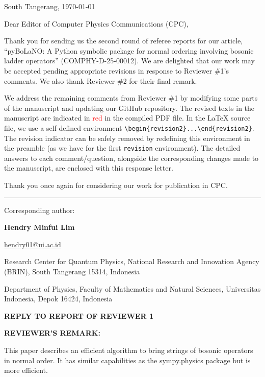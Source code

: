\documentclass[12pt, a4paper]{article}
\newcommand{\review}[1]{
\newpage
\phantomsection
\begin{center}
\Large{\uppercase{{\textbf{Reply to Report of Reviewer {#1}}}}}
\end{center}
}
\newenvironment{revremark}{%
\phantomsection
\vspace{12pt}
\color{RoyalPurple}
\par
\textbf{REVIEWER'S REMARK:}
\par
}
{}
\begin{document}
\sloppy


\begin{flushright}
    South Tangerang, \today
\end{flushright}

\bigskip

Dear Editor of Computer Physics Communications (CPC), 

Thank you for sending us the second round of referee reports for our article, ``pyBoLaNO: A Python symbolic package for normal ordering involving bosonic ladder operators'' (COMPHY-D-25-00012). We are delighted that our work may be accepted pending appropriate revisions in response to Reviewer \#1’s comments. We also thank Reviewer \#2 for their final remark.

We address the remaining comments from Reviewer \#1 by modifying some parts of the manuscript and updating our GitHub repository. The revised texts in the manuscript are indicated in \textcolor{red}{red} in the compiled PDF file. In the LaTeX source file, we use a self-defined environment \verb|\begin{revision2}...\end{revision2}|. The revision indicator can be safely removed by redefining this environment in the preamble (as we have for the first \texttt{revision} environment). The detailed answers to each comment/question, alongside the corresponding changes made to the manuscript, are enclosed with this response letter.

Thank you once again for considering our work for publication in CPC.

\bigskip
\hrule
\bigskip

Corresponding author:

\textbf{Hendry Minfui Lim}\

\url{hendry01@ui.ac.id}

{Research Center for Quantum Physics, National Research and Innovation Agency (BRIN), South Tangerang 15314, Indonesia}

{Department of Physics, Faculty of Mathematics and Natural Sciences, Universitas Indonesia, Depok 16424, Indonesia}


\review{1}


\begin{revremark}
This paper describes an efficient algorithm to bring strings of bosonic operators in normal order. It has similar capabilities as the sympy.physics package but is more efficient.
\end{revremark}
\end{document}
